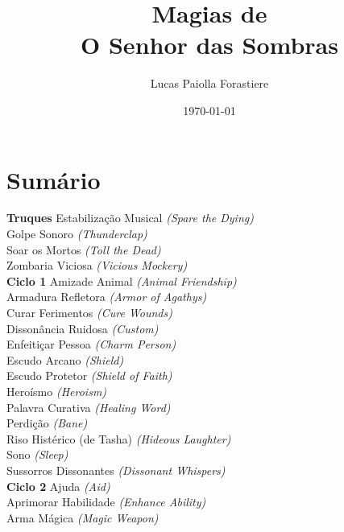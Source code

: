 \documentclass{RPG_Adventure}[2021/10/20]
\title{Magias de\\ \Huge{O Senhor das Sombras}}
\date{\today}
\author{Lucas Paiolla Forastiere}
\begin{document}
\maketitle

\chapter{Sumário}\n\n\noindent\textbf{Truques}
{\normalsize Estabilização Musical \textit{(Spare the Dying)}\\ }
{\normalsize Golpe Sonoro \textit{(Thunderclap)}\\ }
{\normalsize Soar os Mortos \textit{(Toll the Dead)}\\ }
{\normalsize Zombaria Viciosa \textit{(Vicious Mockery)}\\ }
\jump\noindent\textbf{Ciclo 1}
{\normalsize Amizade Animal \textit{(Animal Friendship)}\\ }
{\normalsize Armadura Refletora \textit{(Armor of Agathys)}\\ }
{\normalsize Curar Ferimentos \textit{(Cure Wounds)}\\ }
{\normalsize Dissonância Ruidosa \textit{(Custom)}\\ }
{\normalsize Enfeitiçar Pessoa \textit{(Charm Person)}\\ }
{\normalsize Escudo Arcano \textit{(Shield)}\\ }
{\normalsize Escudo Protetor \textit{(Shield of Faith)}\\ }
{\normalsize Heroísmo \textit{(Heroism)}\\ }
{\normalsize Palavra Curativa \textit{(Healing Word)}\\ }
{\normalsize Perdição \textit{(Bane)}\\ }
{\normalsize Riso Histérico (de Tasha) \textit{(Hideous Laughter)}\\ }
{\normalsize Sono \textit{(Sleep)}\\ }
{\normalsize Sussorros Dissonantes \textit{(Dissonant Whispers)}\\ }
\jump\noindent\textbf{Ciclo 2}
{\normalsize Ajuda \textit{(Aid)}\\ }
{\normalsize Aprimorar Habilidade \textit{(Enhance Ability)}\\ }
{\normalsize Arma Mágica \textit{(Magic Weapon)}\\ }
\end{document}
